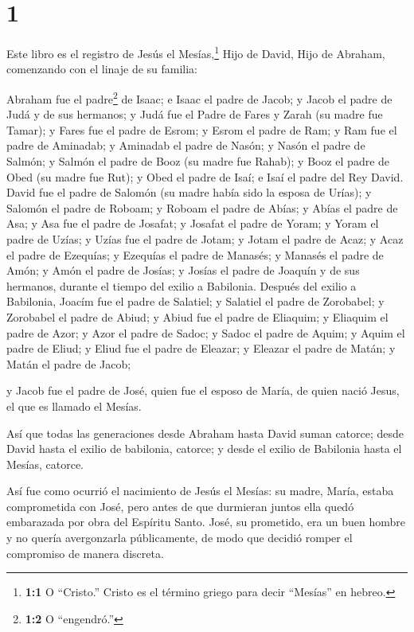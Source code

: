 \hypertarget{section}{%
\section{1}\label{section}}

 Este libro es el registro de Jesús el Mesías,\footnote{\textbf{1:1}
  O ``Cristo.'' Cristo es el término griego para decir ``Mesías'' en
  hebreo.} Hijo de David, Hijo de Abraham, comenzando con el linaje de
su familia:

 Abraham fue el padre\footnote{\textbf{1:2} O ``engendró.''}
de Isaac; e Isaac el padre de Jacob; y Jacob el padre de Judá y de sus
hermanos;  y Judá fue el Padre de Fares y Zarah (su madre
fue Tamar); y Fares fue el padre de Esrom; y Esrom el padre de Ram;
 y Ram fue el padre de Aminadab; y Aminadab el padre de
Nasón; y Nasón el padre de Salmón;  y Salmón el padre de
Booz (su madre fue Rahab); y Booz el padre de Obed (su madre fue Rut); y
Obed el padre de Isaí;  e Isaí el padre del Rey David. David
fue el padre de Salomón (su madre había sido la esposa de Urías);
 y Salomón el padre de Roboam; y Roboam el padre de Abías; y
Abías el padre de Asa;  y Asa fue el padre de Josafat; y
Josafat el padre de Yoram; y Yoram el padre de Uzías;  y
Uzías fue el padre de Jotam; y Jotam el padre de Acaz; y Acaz el padre
de Ezequías;  y Ezequías el padre de Manasés; y Manasés el
padre de Amón; y Amón el padre de Josías;  y Josías el
padre de Joaquín y de sus hermanos, durante el tiempo del exilio a
Babilonia.  Después del exilio a Babilonia, Joacím fue el
padre de Salatiel; y Salatiel el padre de Zorobabel;  y
Zorobabel el padre de Abiud; y Abiud fue el padre de Eliaquim; y
Eliaquim el padre de Azor;  y Azor el padre de Sadoc; y
Sadoc el padre de Aquim; y Aquim el padre de Eliud;  y
Eliud fue el padre de Eleazar; y Eleazar el padre de Matán; y Matán el
padre de Jacob;

 y Jacob fue el padre de José, quien fue el esposo de
María, de quien nació Jesus, el que es llamado el Mesías.

 Así que todas las generaciones desde Abraham hasta David
suman catorce; desde David hasta el exilio de babilonia, catorce; y
desde el exilio de Babilonia hasta el Mesías, catorce.

 Así fue como ocurrió el nacimiento de Jesús el Mesías: su
madre, María, estaba comprometida con José, pero antes de que durmieran
juntos ella quedó embarazada por obra del Espíritu Santo. 
José, su prometido, era un buen hombre y no quería avergonzarla
públicamente, de modo que decidió romper el compromiso de manera
discreta.

